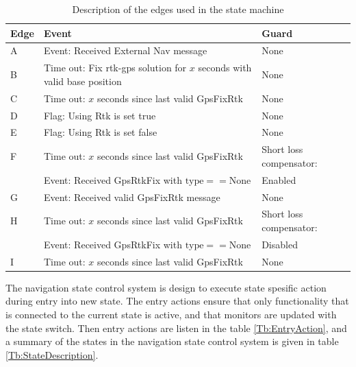 \begin{table}[H]

    \begin{tabular}{ | p{1cm} | p{8cm} | | p{4cm} |}
    \hline
    \textbf{Edge} 	& \textbf{Event} 																	& \textbf{Guard} \\ \hline
    A 				& Event: Received External Nav message 												& None \\ \hline
    B 				& Time out: Fix \gls{rtk-gps} solution for $x$ seconds with valid base position 	& None \\ \hline
    C 				& Time out: $x$ seconds since last valid GpsFixRtk 									& None \\ \hline
    D 				& Flag: Using Rtk is set true														& None \\ \hline
    E 				& Flag: Using Rtk is set false														& None \\ \hline
    F 				& Time out: $x$ seconds since last valid GpsFixRtk 									& Short loss compensator:\\ 
      				& Event: Received GpsRtkFix with $\text{type}==\text{None}$ 						& Enabled\\ \hline
    G 				& Event: Received valid GpsFixRtk message											& None \\ \hline
    H 				& Time out: $x$ seconds since last valid GpsFixRtk 									& Short loss compensator:\\
    				& Event: Received GpsRtkFix with $\text{type}==\text{None}$							& Disabled \\ \hline
    I 				& Time out: $x$ seconds since last valid GpsFixRtk 									& None \\ \hline
    \end{tabular}

\caption{Description of the edges used in the state machine}
\label{Tb:Nav state edge}
\end{table}
The navigation state control system is design to execute state spesific action during entry into new state. The entry actions ensure that only functionality that is connected to the current state is active, and that monitors are updated with the state switch. Then entry actions are listen in the table \ref{Tb:EntryAction}, and a summary of the states in the navigation state control system is given in table \ref{Tb:StateDescription}.
